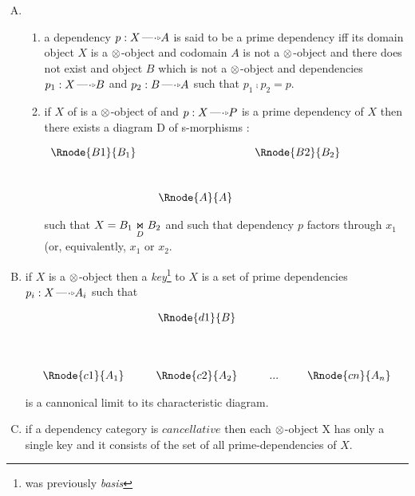 \documentclass[10pt,a4paper]{scrartcl}
\begin{document}
\begin{enumerate} [A.,leftmargin=0.5cm]
such that $X=\fibrex{B_1}{B_2}{D}$ .
\item
\begin{enumerate}[label*=\arabic*]
\item
{}
a dependency $p:X \dmorph A$ is said to be a prime dependency iff its domain object $X$ is a $\otimes$-object and 
codomain $A$ is not a $\otimes$-object and there does not exist and object $B$ which is not a $\otimes$-object and dependencies $p_1:X \dmorph B$ and $p_2: B \dmorph A$ such that $p_1 \comp p_2 = p$. 
\item
{}
if $X$ of is  a $\otimes$-object of 
and $p:X \dmorph  P$ is a prime dependency of $X$ then there exists
a diagram D of s-morphisms :
	\begin{center}
$
\begin{array}{cp{0cm}cp{0cm}c}
\Rnode{B1}{B_1}& &            &  &\Rnode{B2}{B_2} \\ [1.0cm]
               & &\Rnode{A}{A}& &
\end{array}
$
\end{center}


such that $X=\fibrex{B_1}{B_2}{D}$  and such that dependency $p$ factors through $x_1$ (or, equivalently, $x_1$ or $x_2$. 
\end{enumerate}

\item 
{}
if $X$ is a $\otimes$-object then a \textit{key}\footnote{was previously \textit{basis}} to $X$ is a set of prime dependencies $p_i: X \dmorph A_i$ 
such that 
\begin{center}
\begin{displaymath}
\begin{array}{cp{0.3cm}c         p{0.3cm}  c p{0.2cm} c}
               & & \Rnode{d1}{B} & &     & &  \\ [1.4cm]
\Rnode{c1}{A_1}& &\Rnode{c2}{A_2}& & ... & &\Rnode{cn}{A_n}
\end{array}
\end{displaymath}
\end{center}

is a cannonical limit to its characteristic diagram.
\item
{}
if a dependency category  is $cancellative$ then each $\otimes$-object X has only a single key and it consists 
of the set of all prime-dependencies of $X$.


\end{enumerate}
\end{document}
